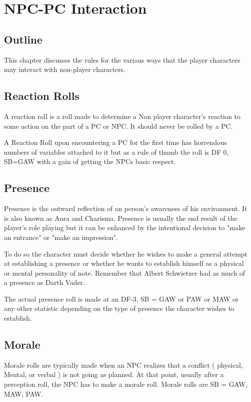 \chapter{NPC-PC Interaction}

\section{Outline}

This chapter discusses the rules for the various ways that the player 
characters may interact with 
non-player characters.

\section{Reaction Rolls}

A reaction roll is a roll made to determine a Non player character's 
reaction to some action on the part of a PC or NPC. It should never 
be rolled by a PC.

A Reaction Roll upon encountering a PC for the first time has 
horrendous numbers of variables attached to it but as a rule of thumb 
the roll is DF 0, SB=GAW with a gain of getting the NPCs basic respect.

\section{Presence}

Presence is the outward reflection of an person's awareness of his 
environment. It is also known as Aura and Charisma. Presence is 
usually the end result of the player's role playing but it can be 
enhanced by the intentional decision to "make an entrance" or "make an 
impression".

To do so the character must decide whether he wishes to make a
general attempt at establishing a presence or whether he wants to 
establish himself as a physical or mental personality of note.
Remember that Albert Schwietzer had as much of a presence as Darth
Vader.

The actual presence roll is made at an DF-3, SB = GAW or PAW or MAW or
any other statistic depending on the type of presence the character wishes to establish. 

\section{Morale}

Morale rolls are typically made when an NPC realizes that a conflict
( physical, Mental, or verbal ) is not going as planned. At that point,
usually after a perception roll, the NPC has to make a morale roll. 
Morale rolls are SB = GAW, MAW, PAW.



